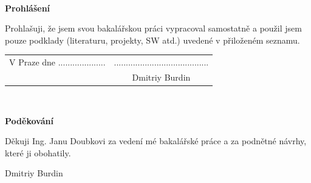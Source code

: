 \documentclass[a4paper,12pt,twoside]{scrreprt}
\newcommand{\autor}{Dmitriy Burdin}           %
\begin{document}



\newpage %
\thispagestyle{empty}  %

~ %
\vfill %

{\bf Prohlášení} %

\vspace{0.5cm} %
Prohlašuji, že jsem svou bakalářskou práci vypracoval samostatně a použil jsem pouze podklady
(literaturu, projekty, SW atd.) uvedené v přiloženém seznamu.

\vspace{5mm}  %
\begin{tabularx}{\textwidth}{X c}                               	%
    V Praze dne .................... &........................................ \\	%
	& \autor
\end{tabularx}	%

\newpage
\thispagestyle{empty}

~
\vfill %

{\bf Poděkování}

\vspace{5mm} %
Děkuji Ing. Janu Doubkovi za vedení mé bakalářské práce a za podnětné návrhy, které ji obohatily.

\begin{flushright}
\autor
\end{flushright}  %

\newpage   %
\thispagestyle{empty}   %
\end{document}
